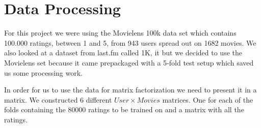 \section{Data Processing}\label{sec:data_preprocessing}
For this project we were using the Movielens 100k data set which contains 100.000 ratings, between 1 and 5, from 943 users spread out on 1682 movies\cite{movielens100k}. 
We also looked at a dataset from last.fm called 1K\cite{lastfmdataset}, it but we decided to use the Movielens set because it came prepackaged with a 5-fold test setup which saved us some processing work.

In order for us to use the data for matrix factorization we need to present it in a matrix. We constructed 6 different $User \times Movies$ matrices. One for each of the folds containing the 80000 ratings to be trained on and a matrix with all the ratings.


